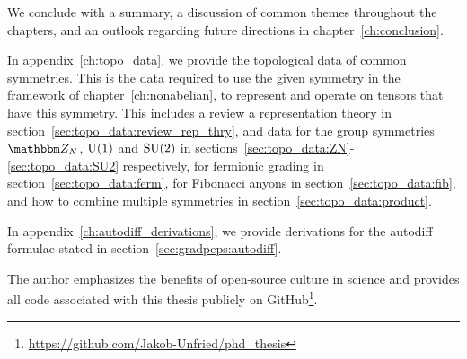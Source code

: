 We conclude with a summary, a discussion of common themes throughout the chapters, and an outlook regarding future directions in chapter~\ref{ch:conclusion}.

In appendix~\ref{ch:topo_data}, we provide the topological data of common symmetries.
%
This is the data required to use the given symmetry in the framework of chapter~\ref{ch:nonabelian}, to represent and operate on tensors that have this symmetry.
%
This includes a review a representation theory in section~\ref{sec:topo_data:review_rep_thry}, and data for the group symmetries $\Zbb_N$, $\mathrm{U}(1)$ and $\mathrm{SU}(2)$ in sections~\ref{sec:topo_data:ZN}-\ref{sec:topo_data:SU2} respectively, for fermionic grading in section~\ref{sec:topo_data:ferm}, for Fibonacci anyons in section~\ref{sec:topo_data:fib}, and how to combine multiple symmetries in section~\ref{sec:topo_data:product}.

In appendix~\ref{ch:autodiff_derivations}, we provide derivations for the autodiff formulae stated in section~\ref{sec:gradpeps:autodiff}.

The author emphasizes the benefits of open-source culture in science and provides all code associated with this thesis publicly on GitHub\footnote{
    \url{https://github.com/Jakob-Unfried/phd_thesis}
}.


